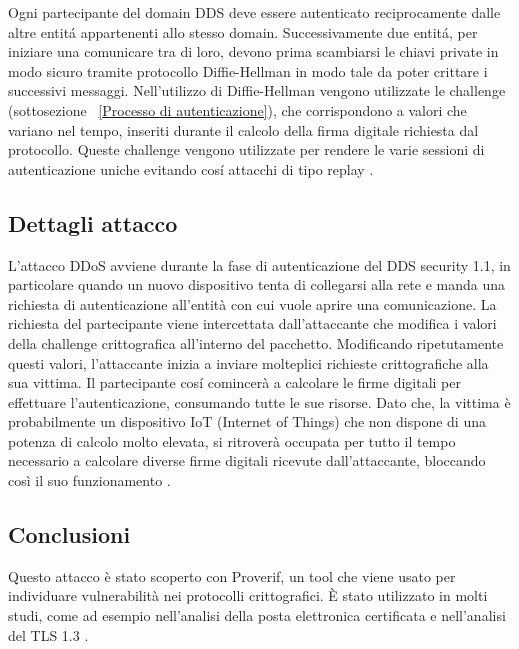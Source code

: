 Ogni partecipante del domain DDS deve essere autenticato reciprocamente
dalle altre entitá appartenenti allo stesso domain.
Successivamente due entitá,
per iniziare una comunicare tra di loro, devono prima
scambiarsi le chiavi private
in modo
sicuro tramite protocollo Diffie-Hellman in modo tale da poter 
crittare i successivi
messaggi. Nell'utilizzo di Diffie-Hellman vengono utilizzate
le challenge (sottosezione ~\ref{Processo di autenticazione}), 
che corrispondono a valori che variano nel tempo, 
inseriti durante il calcolo
della firma digitale richiesta dal protocollo. 
Queste challenge vengono utilizzate per rendere le varie sessioni 
di autenticazione uniche evitando cosí attacchi di tipo replay
\cite{DBLP:conf/asiaccs/WangLG24}.



\subsection{Dettagli attacco}
L'attacco DDoS avviene durante la fase di autenticazione del
DDS security 1.1, in particolare quando un nuovo dispositivo tenta di
collegarsi alla rete e manda una richiesta di autenticazione
all'entità con cui vuole aprire una comunicazione. 
La richiesta del partecipante viene intercettata
dall'attaccante che modifica i valori della challenge crittografica 
all'interno del pacchetto. Modificando ripetutamente questi valori, l'attaccante
inizia a inviare molteplici richieste crittografiche alla sua vittima.
Il partecipante cosí comincerà a calcolare le firme digitali per effettuare
l'autenticazione, consumando tutte le sue risorse.
Dato che, la vittima è probabilmente un dispositivo IoT
(Internet of Things)
che non dispone di una potenza di calcolo molto elevata, si ritroverà
occupata per tutto il tempo necessario a calcolare diverse firme digitali
ricevute dall'attaccante, bloccando così il suo funzionamento
\cite{DBLP:conf/asiaccs/WangLG24}.


\subsection{Conclusioni}
Questo attacco è stato scoperto con Proverif, un tool che viene usato
per individuare vulnerabilità nei protocolli crittografici. 
È stato utilizzato in molti studi, come ad esempio nell'analisi della 
posta elettronica certificata e nell'analisi del TLS 1.3 \cite{proverifmanual}.

